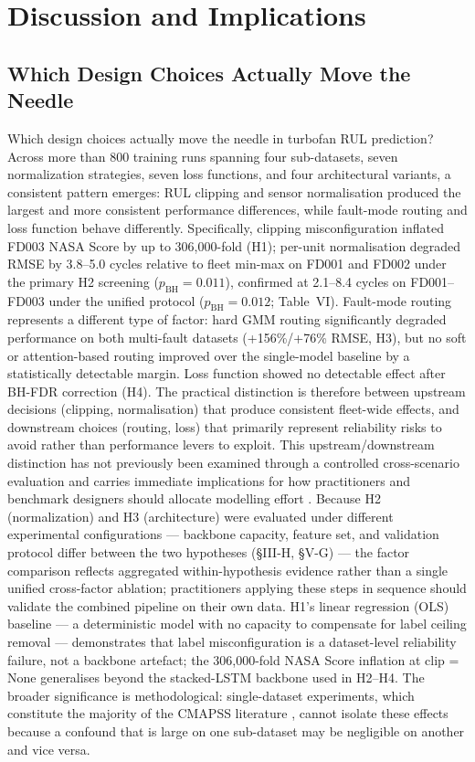 \documentclass[preprint,10pt]{elsarticle}
\begin{document}
\section{Discussion and Implications}

\subsection{Which Design Choices Actually Move the Needle}

Which design choices actually move the needle in turbofan RUL prediction? Across more than 800 training runs spanning four sub-datasets, seven normalization strategies, seven loss functions, and four architectural variants, a consistent pattern emerges: RUL clipping and sensor normalisation produced the largest and more consistent performance differences, while fault-mode routing and loss function behave differently. Specifically, clipping misconfiguration inflated FD003 NASA Score by up to 306,000-fold (H1); per-unit normalisation degraded RMSE by 3.8--5.0 cycles relative to fleet min-max on FD001 and FD002 under the primary H2 screening ($p_\text{BH} = 0.011$), confirmed at 2.1--8.4 cycles on FD001--FD003 under the unified protocol ($p_\text{BH} = 0.012$; Table~VI). Fault-mode routing represents a different type of factor: hard GMM routing significantly degraded performance on both multi-fault datasets (+156\%/+76\% RMSE, H3), but no soft or attention-based routing improved over the single-model baseline by a statistically detectable margin. Loss function showed no detectable effect after BH-FDR correction (H4). The practical distinction is therefore between upstream decisions (clipping, normalisation) that produce consistent fleet-wide effects, and downstream choices (routing, loss) that primarily represent reliability risks to avoid rather than performance levers to exploit. This upstream/downstream distinction has not previously been examined through a controlled cross-scenario evaluation and carries immediate implications for how practitioners and benchmark designers should allocate modelling effort \cite{ref05,ref06}. Because H2 (normalization) and H3 (architecture) were evaluated under different experimental configurations --- backbone capacity, feature set, and validation protocol differ between the two hypotheses (\S{}III-H, \S{}V-G) --- the factor comparison reflects aggregated within-hypothesis evidence rather than a single unified cross-factor ablation; practitioners applying these steps in sequence should validate the combined pipeline on their own data. H1's linear regression (OLS) baseline --- a deterministic model with no capacity to compensate for label ceiling removal --- demonstrates that label misconfiguration is a dataset-level reliability failure, not a backbone artefact; the 306,000-fold NASA Score inflation at clip = None generalises beyond the stacked-LSTM backbone used in H2--H4. The broader significance is methodological: single-dataset experiments, which constitute the majority of the CMAPSS literature \cite{ref09,ref14,ref15}, cannot isolate these effects because a confound that is large on one sub-dataset may be negligible on another and vice versa.
\end{document}
